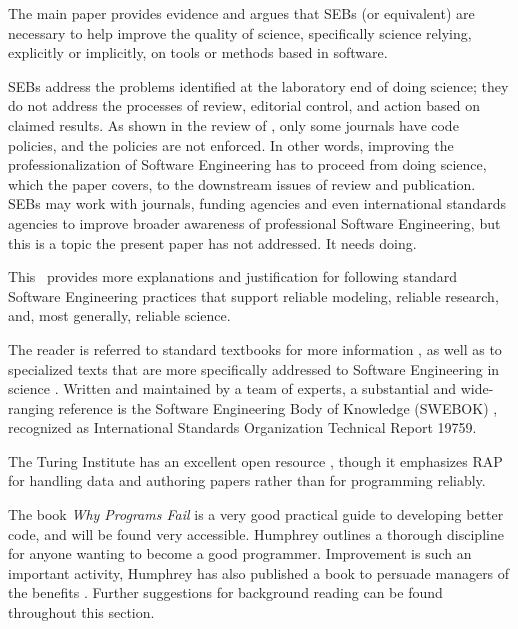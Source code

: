 \documentclass[10pt,a4paper]{article}
\begin{document}
The main paper provides evidence and argues that SEBs (or equivalent) are necessary to help improve the quality of science, specifically science relying, explicitly or implicitly, on tools or methods based in software. 

SEBs address the problems identified at the laboratory end of doing science; they do not address the processes of review, editorial control, and action based on claimed results. As shown in the review of , only some journals have code policies, and the policies are not enforced. In other words, improving the professionalization of Software Engineering has to proceed from doing science, which the paper covers, to the downstream issues of review and publication. SEBs may work with journals, funding agencies and even international standards agencies to improve broader awareness of professional Software Engineering, but this is a topic the present paper has not addressed. It needs doing.

\label{supplementary-best-practice}

This \supplement\ provides more explanations and justification for following standard Software Engineering practices that support reliable modeling, reliable research, and, most generally, reliable science. 

The reader is referred to standard textbooks for more information , as well as to specialized texts that are more specifically addressed to Software Engineering in science . Written and maintained by a team of experts, a substantial and wide-ranging reference is the Software Engineering Body of Knowledge (SWEBOK) \cite{swebok}, recognized as International Standards Organization Technical Report 19759.

The Turing Institute has an excellent open resource \cite{turing-way}, though it emphasizes RAP for handling data and authoring papers rather than for programming reliably.

The book \emph{Why Programs Fail\/} \cite{wpf} is a very good practical guide to developing better code, and will be found very accessible. Humphrey \cite{humphrey} outlines a thorough discipline for anyone wanting to become a good programmer. Improvement is such an important activity, Humphrey has also published a book to persuade managers of the benefits \cite{managers}. Further suggestions for background reading can be found throughout this section.
\end{document}
